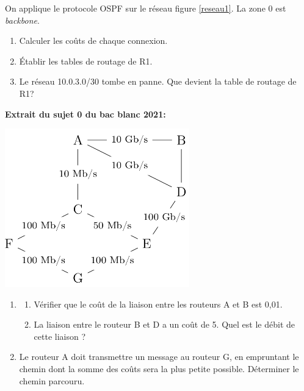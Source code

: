 \documentclass[a4paper,11pt]{article}
\begin{document}
\begin{exo}
\begin{center}
        \label{reseau1}
    \end{center}
    On applique le protocole OSPF sur le réseau figure \ref{reseau1}. La zone 0 est \emph{backbone}.
    \begin{enumerate}
        \item Calculer les coûts de chaque connexion.
        \item Établir les tables de routage de R1.
        \item Le réseau 10.0.3.0/30 tombe en panne. Que devient la table de routage de R1?
    \end{enumerate}
\end{exo}
\pagebreak
\begin{exo}
\textbf{Extrait du sujet 0 du bac blanc 2021: }
\begin{center}
\centering
\includegraphics[width=8cm]{ressources/bacblanc.png}
\label{IMG}
\end{center}
\begin{enumerate}
    \item \begin{enumerate}
        \item Vérifier que le coût de la liaison entre les routeurs A et B est 0,01.
        \item La liaison entre le routeur B et D a un coût de 5. Quel est le débit de cette liaison ?
    \end{enumerate}
    \item Le routeur A doit transmettre un message au routeur G, en empruntant le chemin dont la somme des coûts sera la plus petite possible. Déterminer le chemin parcouru.
\end{enumerate}
\end{exo}
\end{document}
